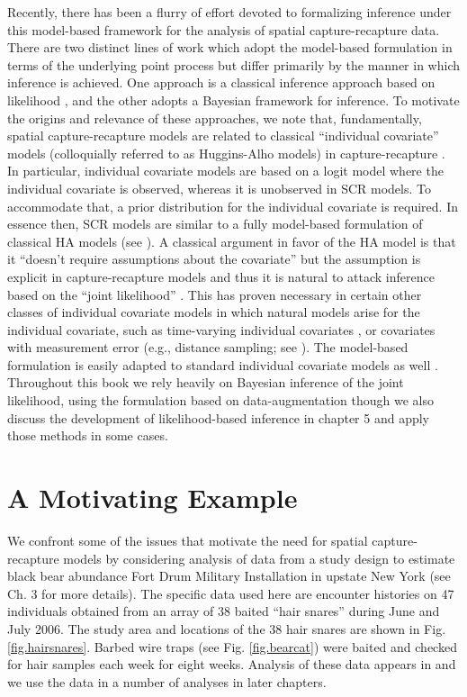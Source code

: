 Recently, there has been a flurry of effort devoted to formalizing
inference under this model-based framework for the analysis of spatial
capture-recapture data. There are two distinct lines of work which
adopt the model-based formulation in terms of the underlying point
process but differ primarily by the manner in which inference is
achieved. One approach is a classical inference approach based on
likelihood \citep{borchers_efford:2008}, and the other adopts a
Bayesian framework for inference. To motivate the origins and
relevance of these approaches, we note that, fundamentally, spatial
capture-recapture models are related to classical ``individual
covariate'' models (colloquially referred to as Huggins-Alho 
models) in capture-recapture \citep{huggins:1989, alho:1990}.
In particular, individual covariate models 
are based on a logit model where the
individual covariate is observed, whereas it is unobserved in SCR
models. To accommodate that, a prior distribution for the individual
covariate is required. In essence then, SCR models are similar to a
fully model-based formulation of classical HA models (see
\citet{royle:2009}). A classical argument in favor of the HA model is
that it ``doesn't require assumptions about the covariate'' but the
assumption is explicit in capture-recapture models and thus it is
natural to attack inference based on the ``joint likelihood''
\citep{borchers_etal:2002}. This has proven necessary in certain other
classes of individual covariate models in which natural models arise
for the individual covariate, such as time-varying individual
covariates \citep{bonner_schwarz:2006}, or covariates with measurement
error (e.g., distance sampling; see
\citet[][ch. 7]{royle_dorazio:2008}). 
The model-based formulation is easily adapted to standard
individual covariate models as well \citep{royle:2008}. Throughout
this book we rely heavily on Bayesian inference of the joint
likelihood, using the formulation based on data-augmentation
\citep{royle_etal:2007, royle_young:2008, royle:2009} though we also
discuss the development of likelihood-based inference in chapter 5 and
apply those methods in some cases.


\section{ A Motivating Example }
 
We confront some of the issues that motivate the need for spatial
capture-recapture models by considering analysis of data from a study
design to estimate black bear abundance Fort Drum Military
Installation in upstate New York (see Ch. 3 for more details). The
specific data used here are encounter histories on 47 individuals
obtained from an array of 38 baited ``hair snares'' during June and
July 2006. The study area and locations of the 38 hair snares are
shown in Fig. \ref{fig.hairsnares}.  Barbed wire traps (see
Fig. \ref{fig.bearcat}) were baited and checked for hair samples each
week for eight weeks.  Analysis of these data appears in
\citet{gardner_etal:2010} and we use the data in a number of analyses
in later chapters.

